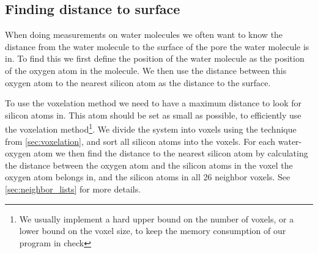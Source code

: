 \subsection{Finding distance to surface\label{sec:find_distance_to_surface}}
When doing measurements on water molecules we often want to know the distance from the water molecule to the surface of the pore the water molecule is in. To find this we first define the position of the water molecule as the position of the oxygen atom in the molecule. We then use the distance between this oxygen atom to the nearest silicon atom as the distance to the surface.

To use the voxelation method we need to have a maximum distance to look for silicon atoms in. This atom should be set as small as possible, to efficiently use the voxelation method\footnote{We usually implement a hard upper bound on the number of voxels, or a lower bound on the voxel size, to keep the memory consumption of our program in check}. We divide the system into voxels using the technique from \cref{sec:voxelation}, and sort all silicon atoms into the voxels. For each water-oxygen atom we then find the distance to the nearest silicon atom by calculating the distance between the oxygen atom and the silicon atoms in the voxel the oxygen atom belongs in, and the silicon atoms in all 26 neighbor voxels. See \cref{sec:neighbor_lists} for more details.

\FloatBarrier



\FloatBarrier
